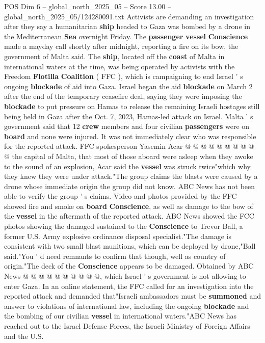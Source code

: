 \begin{textsample}{POS Dim 6 – global\_north\_2025\_05 – Score 13.00 – global\_north\_2025\_05/124280091.txt}  \label{ex:f6_pos_046}
Activists are demanding an investigation after they say a humanitarian \textbf{ship} headed to Gaza was bombed by a drone in the Mediterranean \textbf{Sea} overnight Friday.
The \textbf{passenger} \textbf{vessel} \textbf{Conscience} made a mayday call shortly after midnight, reporting a fire on its bow, the government of Malta said.
The \textbf{ship}, located off the \textbf{coast} of Malta in international waters at the time, was being operated by activists with the Freedom \textbf{Flotilla} \textbf{Coalition} ( FFC ), which is campaigning to end Israel ' s ongoing \textbf{blockade} of aid into Gaza.
Israel began the aid \textbf{blockade} on March 2 after the end of the temporary ceasefire deal, saying they were imposing the \textbf{blockade} to put pressure on Hamas to release the remaining Israeli hostages still being held in Gaza after the Oct. 7, 2023, Hamas-led attack on Israel.
Malta ' s government said that 12 \textbf{crew} members and four civilian \textbf{passengers} were on \textbf{board} and none were injured.
It was not immediately clear who was responsible for the reported attack.
FFC spokesperson Yasemin Acar @ @ @ @ @ @ @ @ @ @ the capital of Malta, that most of those aboard were asleep when they awoke to the sound of an explosion, Acar said the \textbf{vessel} was struck twice"which why they knew they were under attack."The group claims the blasts were caused by a drone whose immediate origin the group did not know.
ABC News has not been able to verify the group ' s claims.
Video and photos provided by the FFC showed fire and smoke on \textbf{board} \textbf{Conscience}, as well as damage to the bow of the \textbf{vessel} in the aftermath of the reported attack.
ABC News showed the FCC photos showing the damaged sustained to the \textbf{Conscience} to Trevor Ball, a former U.S.
Army explosive ordinance disposal specialist."The damage is consistent with two small blast munitions, which can be deployed by drone,"Ball said."You ' d need remnants to confirm that though, well as country of origin."The deck of the \textbf{Conscience} appears to be damaged.
Obtained by ABC News @ @ @ @ @ @ @ @ @ @, which Israel ' s government is not allowing to enter Gaza.
In an online statement, the FFC called for an investigation into the reported attack and demanded that"Israeli ambassadors must be \textbf{summoned} and answer to violations of international law, including the ongoing \textbf{blockade} and the bombing of our civilian \textbf{vessel} in international waters."ABC News has reached out to the Israel Defense Forces, the Israeli Ministry of Foreign Affairs and the U.S.

\end{textsample}
